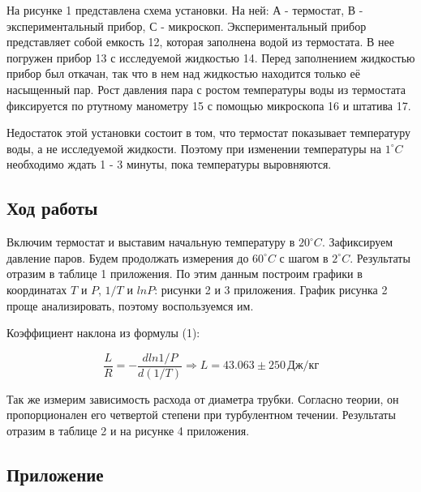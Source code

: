 \documentclass[a4paper, fontsize = 14pt]{article}
\begin{document}
На рисунке 1 представлена схема установки. На ней: А - термостат, В - экспериментальный прибор, С - микроскоп. Экспериментальный прибор представляет собой емкость 12, которая заполнена водой из термостата. В нее погружен прибор 13 с исследуемой жидкостью 14. Перед заполнением жидкостью прибор был откачан, так что в нем над жидкостью находится только её насыщенный пар. Рост давления пара с ростом температуры воды из термостата фиксируется по ртутному манометру 15 с помощью микроскопа 16 и штатива 17.

Недостаток этой установки состоит в том, что термостат показывает температуру воды, а не исследуемой жидкости. Поэтому при изменении температуры на $1^\circ C$ необходимо ждать 1 - 3 минуты, пока температуры выровняются.

\subsection*{Ход работы}

Включим термостат и выставим начальную температуру в $20^\circ C$. Зафиксируем давление паров. Будем продолжать измерения до $60^\circ C$ с шагом в $2^\circ C$. Результаты отразим в таблице 1 приложения. По этим данным построим графики в координатах $T$ и $P$, $1/T$ и $ln{P}$: рисунки 2 и 3 приложения. График рисунка 2 проще анализировать, поэтому воспользуемся им. 

Коэффициент наклона из формулы (1):

\begin{equation}
	\frac{L}{R}= - \frac{d ln{1/P}}{d(1/T)} \Longrightarrow L = 43.063\pm250 \, Дж/кг
\end{equation}

Так же измерим зависимость расхода от диаметра трубки. Согласно теории, он пропорционален его четвертой степени при турбулентном течении. Результаты отразим в таблице 2 и на рисунке 4 приложения.

\newpage

\subsection*{Приложение}
\end{document}
